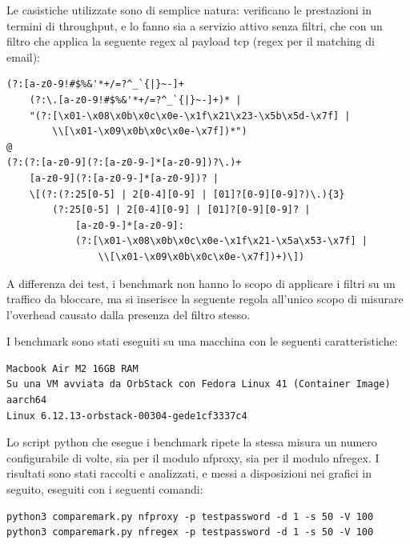 Le casistiche utilizzate sono di semplice natura: verificano le prestazioni in termini di throughput, e lo fanno sia a servizio attivo senza filtri, che con un filtro che applica la seguente \gls{regex} al payload \gls{tcp} (\gls{regex} per il matching di email):
\begin{verbatim}
(?:[a-z0-9!#$%&'*+/=?^_`{|}~-]+
    (?:\.[a-z0-9!#$%&'*+/=?^_`{|}~-]+)* |
    "(?:[\x01-\x08\x0b\x0c\x0e-\x1f\x21\x23-\x5b\x5d-\x7f] |
        \\[\x01-\x09\x0b\x0c\x0e-\x7f])*")
@
(?:(?:[a-z0-9](?:[a-z0-9-]*[a-z0-9])?\.)+
    [a-z0-9](?:[a-z0-9-]*[a-z0-9])? |
    \[(?:(?:25[0-5] | 2[0-4][0-9] | [01]?[0-9][0-9]?)\.){3}
        (?:25[0-5] | 2[0-4][0-9] | [01]?[0-9][0-9]? |
            [a-z0-9-]*[a-z0-9]:
            (?:[\x01-\x08\x0b\x0c\x0e-\x1f\x21-\x5a\x53-\x7f] |
                \\[\x01-\x09\x0b\x0c\x0e-\x7f])+)\])
\end{verbatim}

A differenza dei test, i benchmark non hanno lo scopo di applicare i filtri su un traffico da bloccare, ma si inserisce la seguente regola all'unico scopo di misurare l'overhead causato dalla presenza del filtro stesso.

I benchmark sono stati eseguiti su una macchina con le seguenti caratteristiche:
\begin{listing}[H]
\begin{verbatim}
Macbook Air M2 16GB RAM
Su una VM avviata da OrbStack con Fedora Linux 41 (Container Image) aarch64
Linux 6.12.13-orbstack-00304-gede1cf3337c4
\end{verbatim}
\vspace{-1em}
\end{listing}

Lo script python che esegue i benchmark ripete la stessa misura un numero configurabile di volte, sia per il modulo \gls{nfproxy}, sia per il modulo \gls{nfregex}.
I risultati sono stati raccolti e analizzati, e messi a disposizioni nei grafici in seguito, eseguiti con i seguenti comandi:
\begin{listing}[H]
\begin{verbatim}
python3 comparemark.py nfproxy -p testpassword -d 1 -s 50 -V 100
python3 comparemark.py nfregex -p testpassword -d 1 -s 50 -V 100
\end{verbatim}
\vspace{-1em}
\end{listing}

